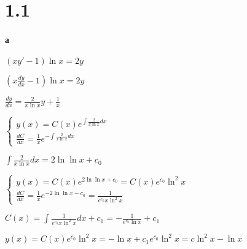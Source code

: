 \documentclass[russian]{article}
\begin{document}
\section*{1.1}
\paragraph*{а}
$(xy' - 1) \ln x = 2y$

$(x \frac{dy}{dx} - 1) \ln x = 2y$

$\frac{dy}{dx} = \frac{2}{x \ln x} y + \frac{1}{x}$

$\begin{cases}
y(x) = C(x) e^{\int \frac{2}{x \ln x} dx} \\
\frac{dC}{dx} = \frac{1}{x} e^{-\int \frac{2}{x \ln x} dx}
\end{cases}$

$\int \frac{2}{x \ln x} dx = 2 \ln \ln x + c_0$

$\begin{cases}
y(x) = C(x) e^{2 \ln \ln x + c_0} = C(x) e^{c_0} \ln ^2 x\\
\frac{dC}{dx} = \frac{1}{x} e^{-2 \ln \ln x - c_0} = \frac{1}{e^{c_0} x \ln ^2 x}
\end{cases}$

$C(x) = \int \frac{1}{e^{c_0} x \ln ^2 x} dx + c_1 = - \frac{1}{e^{c_0} \ln x} + c_1$

$y(x) = C(x) e^{c_0} \ln ^2 x = -\ln x + c_1 e^{c_0} \ln ^2 x = c \ln ^2 x - \ln x$
\end{document}

